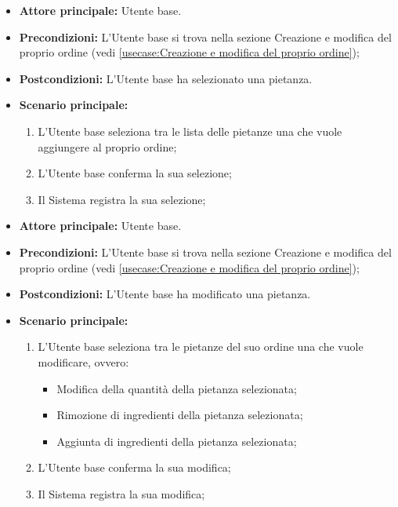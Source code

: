 \label{usecase:Selezione pietanza}
\begin{itemize}
	\item \textbf{Attore principale:} Utente base.

	\item \textbf{Precondizioni:} L'Utente base si trova nella sezione Creazione e modifica del proprio ordine (vedi \autoref{usecase:Creazione e modifica del proprio ordine});

	\item \textbf{Postcondizioni:} L'Utente base ha selezionato una pietanza.

	\item \textbf{Scenario principale:}
	      \begin{enumerate}
		      \item L'Utente base seleziona tra le lista delle pietanze una che vuole aggiungere al proprio ordine;
		      \item L'Utente base conferma la sua selezione;
		      \item Il Sistema registra la sua selezione;
	      \end{enumerate}
\end{itemize}

\label{usecase:Modifica pietanza}
\begin{itemize}
	\item \textbf{Attore principale:} Utente base.

	\item \textbf{Precondizioni:} L'Utente base si trova nella sezione Creazione e modifica del proprio ordine (vedi \autoref{usecase:Creazione e modifica del proprio ordine});

	\item \textbf{Postcondizioni:} L'Utente base ha modificato una pietanza.

	\item \textbf{Scenario principale:}
	      \begin{enumerate}
		      \item L'Utente base seleziona tra le pietanze del suo ordine una che vuole modificare, ovvero:
		      \begin{itemize}
				\item Modifica della quantità della pietanza selezionata;
				\item Rimozione di ingredienti della pietanza selezionata;
				\item Aggiunta di ingredienti della pietanza selezionata;
			  \end{itemize}
		      \item L'Utente base conferma la sua modifica;
		      \item Il Sistema registra la sua modifica;
	      \end{enumerate}
\end{itemize}